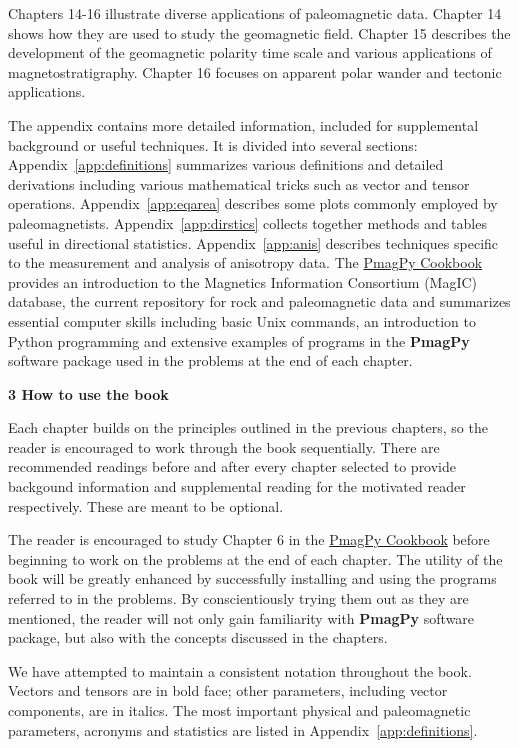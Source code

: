Chapters 14-16 illustrate diverse applications of paleomagnetic data.   Chapter 14 shows how  they are used to study the geomagnetic field.  Chapter 15 describes the development of the geomagnetic polarity time scale and various applications of magnetostratigraphy.  Chapter 16 focuses on apparent polar wander and tectonic applications.   

The appendix contains more detailed information,  included for supplemental background or useful techniques.  It is divided into several sections:  Appendix~\ref{app:definitions} summarizes various definitions and detailed derivations including various mathematical tricks such as vector and tensor operations.  Appendix~\ref{app:eqarea} describes some plots commonly employed by paleomagnetists.   Appendix~\ref{app:dirstics} collects together methods and tables useful in directional  statistics.    Appendix~\ref{app:anis} describes techniques specific to the measurement and analysis of anisotropy data.   The   \href{http://earthref.org/PmagPy/cookbook/}{PmagPy Cookbook}  provides an introduction to the Magnetics Information Consortium (MagIC) database, the current repository for rock and paleomagnetic data and  summarizes essential computer skills including basic Unix commands,  an introduction to Python programming and extensive examples of  programs in the  {\bf PmagPy}  software package  used in the problems at the end of each chapter.  

\noindent
{\bf 3 How to use the book}


 Each chapter builds on
the principles outlined in the previous chapters, so the reader is encouraged
to work through the book sequentially.    There are recommended readings before and after every chapter selected to provide backgound information and supplemental reading for the motivated reader respectively.  These are meant to be optional.  

The reader is encouraged to study  Chapter 6 in the  \href{http://earthref.org/PmagPy/cookbook/}{PmagPy Cookbook} before beginning to work on the problems at the end of each chapter.  The utility of the book
will be greatly enhanced by successfully installing and using the programs
referred to in the problems.     By conscientiously trying them out  as they are mentioned, the  reader
will not only gain familiarity with  {\bf PmagPy} software package, but also
with the concepts discussed in the chapters. 

We  have attempted to maintain a consistent notation throughout the book.
Vectors  and tensors are in bold face; other parameters, including
vector components, are in italics.  The most important 
physical and paleomagnetic parameters, acronyms and statistics are listed in Appendix~\ref{app:definitions}.  

